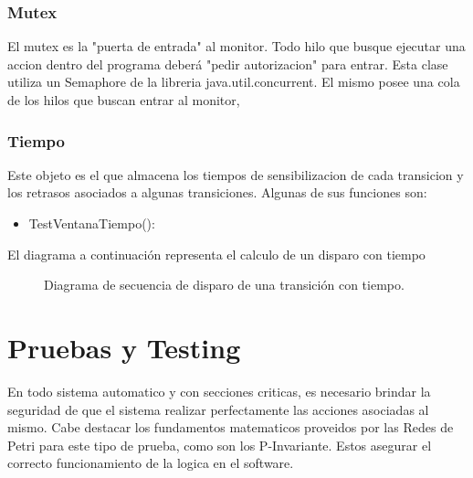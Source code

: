 \documentclass[10pt, a4paper,notitlepage]{article}
\begin{document}
\subsubsection{Mutex}
El mutex es la "puerta de entrada" al monitor. Todo hilo que busque ejecutar una accion dentro del programa deberá "pedir autorizacion" para entrar.
Esta clase utiliza un Semaphore de la libreria java.util.concurrent. El mismo posee una cola de los hilos que buscan entrar al monitor,
\subsubsection{Tiempo}
Este objeto es el que almacena los tiempos de sensibilizacion de cada transicion y los retrasos asociados a algunas transiciones. Algunas de sus funciones son:
\begin{itemize}
	\item TestVentanaTiempo(): 
\end{itemize}
El diagrama a continuación representa el calculo de un disparo con tiempo
\begin{figure}[H] %
	\caption{Diagrama de secuencia de disparo de una transición con tiempo.}
	\label{fig:sec2}
\end{figure}

\section{Pruebas y Testing}
En todo sistema automatico y con secciones criticas, es necesario brindar la seguridad de que el sistema realizar perfectamente las acciones asociadas al mismo.
Cabe destacar los fundamentos matematicos proveidos por las Redes de Petri para este tipo de prueba, como son los P-Invariante. Estos asegurar el correcto funcionamiento de la logica en el software.
\end{document}
